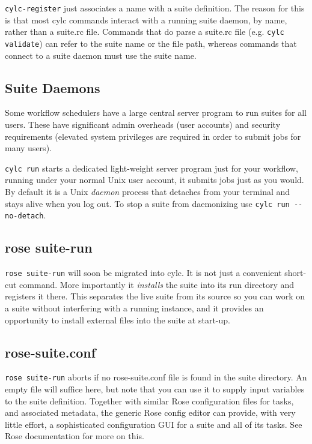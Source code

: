\lstinline{cylc-register} just associates a name with a suite definition.  The
reason for this is that most cylc commands interact with a running suite
daemon, by name, rather than a suite.rc file.  Commands that do parse a
suite.rc file (e.g.  \lstinline=cylc validate=) can refer to the suite name or
the file path, whereas commands that connect to a suite daemon must use the
suite name.

\subsection{Suite Daemons}

Some workflow schedulers have a large central server program to run suites
for all users.  These have significant admin overheads (user accounts) and
security requirements (elevated system privileges are required in order to
submit jobs for many users).

\lstinline=cylc run= starts a dedicated light-weight server program just for your
workflow, running under your normal Unix user account, it submits jobs just
as you would. By default it is a Unix {\em daemon} process that detaches from
your terminal and stays alive when you log out. To stop a suite from
daemonizing use \lstinline=cylc run --no-detach=. 


\subsection{rose suite-run}

\lstinline{rose suite-run} will soon be migrated into cylc. It is not
just a convenient short-cut command. More importantly it {\em installs} the
suite into its run directory and registers it there.  This separates the
live suite from its source so you can work on a suite without interfering with
a running instance, and it provides an opportunity to install external
files into the suite at start-up.

\subsection{rose-suite.conf}

\lstinline=rose suite-run= aborts if no rose-suite.conf file is found in the
suite directory.  An empty file will suffice here, but note that you can use it
to supply input variables to the suite definition.  Together with similar
Rose configuration files for tasks, and associated metadata, the generic Rose
config editor can provide, with very little effort, a sophisticated
configuration GUI for a suite and all of its tasks.  See Rose documentation for
more on this.

